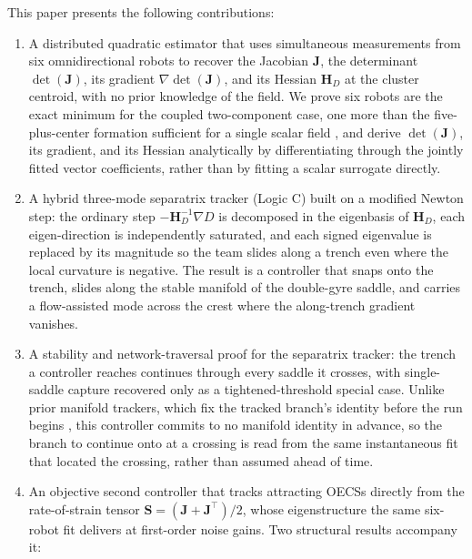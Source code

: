 \documentclass[lettersize,journal]{IEEEtran}
\begin{document}
This paper presents the following contributions:
\begin{enumerate}
    \item A distributed quadratic estimator that uses simultaneous measurements
          from six omnidirectional robots to recover the Jacobian $\mathbf{J}$,
          the determinant $\det(\mathbf{J})$, its gradient
          $\nabla\det(\mathbf{J})$, and its Hessian $\mathbf{H}_D$ at the cluster
          centroid, with no prior knowledge of the field. We prove six robots
          are the exact minimum for the coupled two-component case, one more
          than the five-plus-center formation sufficient for a single scalar
          field \cite{15}, and derive $\det(\mathbf{J})$, its gradient, and its
          Hessian analytically by differentiating through the jointly fitted
          vector coefficients, rather than by fitting a scalar surrogate
          directly.
    \item A hybrid three-mode separatrix tracker (Logic C) built on a
          modified Newton step: the ordinary step
          $-\mathbf{H}_D^{-1}\nabla D$ is decomposed in the eigenbasis of
          $\mathbf{H}_D$, each eigen-direction is independently saturated,
          and each signed eigenvalue is replaced by its magnitude so the
          team slides along a trench even where the local curvature is
          negative. The result is a controller that snaps onto the trench,
          slides along the stable manifold of the double-gyre saddle, and
          carries a flow-assisted mode across the crest where the
          along-trench gradient vanishes.
    \item A stability and network-traversal proof for the separatrix tracker:
          the trench a controller reaches continues through every saddle it
          crosses, with single-saddle capture recovered only as a
          tightened-threshold special case. Unlike prior manifold trackers,
          which fix the tracked branch's identity before the run begins
          \cite{9,10}, this controller commits to no manifold identity in
          advance, so the branch to continue onto at a crossing is read from
          the same instantaneous fit that located the crossing, rather than
          assumed ahead of time.
    \item An objective second controller that tracks attracting OECSs
          directly from the rate-of-strain tensor
          $\mathbf{S} = (\mathbf{J} + \mathbf{J}^\top)/2$, whose
          eigenstructure the same six-robot fit delivers at
          first-order noise gains. Two structural results accompany it:

\end{enumerate}
\end{document}
